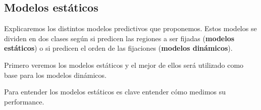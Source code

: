 \documentclass[compress]{beamer}
\begin{document}
\subsection{Modelos estáticos}

\begin{frame}
Explicaremos los distintos modelos predictivos que proponemos. Estos modelos se dividen en dos clases según si predicen las regiones a ser fijadas (\textbf{modelos estáticos}) o si predicen el orden de las fijaciones (\textbf{modelos dinámicos}).

\bigskip

Primero veremos los modelos estáticos y el mejor de ellos será utilizado como base para los modelos dinámicos.

\bigskip

Para entender los modelos estáticos es clave entender cómo medimos su performance.
\end{frame}
\end{document}
